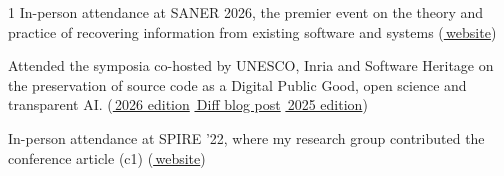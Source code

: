 \documentclass[10pt,a4paper,ragged2e,academicons]{altacv}
\newif\ifshortcv
\newcommand{\Lsep}{\;\textcolor{body!40}{\textbullet}\;}
\begin{document}
\begin{paracol}{1}
In-person attendance at SANER 2026, the premier event on the theory and practice of recovering information from existing software and systems (\href{https://conf.researchr.org/home/saner-2026}{\faGlobe\,website})

\divider


Attended the symposia co-hosted by UNESCO, Inria and Software Heritage on the preservation of source code as a Digital Public Good, open science and transparent AI. (\href{https://www.unesco.org/en/articles/software-heritage-symposium-and-summit}{\faGlobe\,2026 edition} \Lsep \href{https://diff.wikimedia.org/2026/02/16/when-source-code-archival-is-recognised-as-digital-public-good-insights-from-software-heritages-10-year-journey-at-unesco/}{\faGlobe\,Diff blog post} \Lsep \href{https://www.unesco.org/en/articles/software-heritage-2025-symposium-and-summit}{\faGlobe\,2025 edition})




\divider


In-person attendance at SPIRE '22, where my research group contributed the conference article (c1) (\href{http://spire2022.inf.udec.cl/}{\faGlobe\,website})

\fi%

\medskip


\end{paracol}
\end{document}
